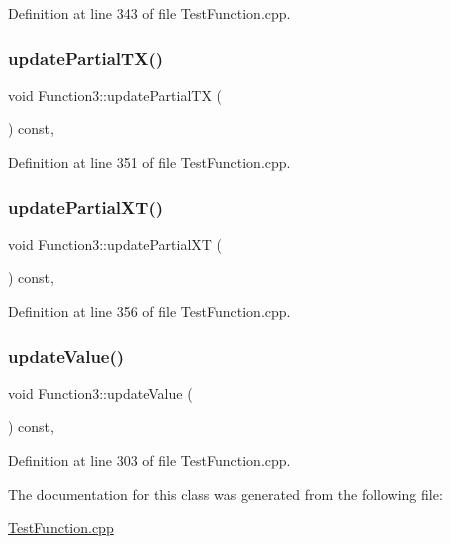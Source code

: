 Definition at line 343 of file Test\+Function.\+cpp.

\hypertarget{classFunction3_a9e969d761e7694eef0c5695cb198f0cd}{}\label{classFunction3_a9e969d761e7694eef0c5695cb198f0cd} 
\subsubsection{\texorpdfstring{update\+Partial\+T\+X()}{updatePartialTX()}}
{\footnotesize\ttfamily void Function3\+::update\+Partial\+TX (\begin{DoxyParamCaption}{ }\end{DoxyParamCaption}) const\hspace{0.3cm}{\ttfamily [inline]}, {\ttfamily [protected]}}



Definition at line 351 of file Test\+Function.\+cpp.

\hypertarget{classFunction3_ac363f9786af5a5bf700943b558ecbe92}{}\label{classFunction3_ac363f9786af5a5bf700943b558ecbe92} 
\subsubsection{\texorpdfstring{update\+Partial\+X\+T()}{updatePartialXT()}}
{\footnotesize\ttfamily void Function3\+::update\+Partial\+XT (\begin{DoxyParamCaption}{ }\end{DoxyParamCaption}) const\hspace{0.3cm}{\ttfamily [inline]}, {\ttfamily [protected]}}



Definition at line 356 of file Test\+Function.\+cpp.

\hypertarget{classFunction3_a61a81957c58f90042f8df6e10974d6ef}{}\label{classFunction3_a61a81957c58f90042f8df6e10974d6ef} 
\subsubsection{\texorpdfstring{update\+Value()}{updateValue()}}
{\footnotesize\ttfamily void Function3\+::update\+Value (\begin{DoxyParamCaption}{ }\end{DoxyParamCaption}) const\hspace{0.3cm}{\ttfamily [inline]}, {\ttfamily [protected]}}



Definition at line 303 of file Test\+Function.\+cpp.



The documentation for this class was generated from the following file\+:\begin{DoxyCompactItemize}
\item 
\hyperlink{TestFunction_8cpp}{Test\+Function.\+cpp}\end{DoxyCompactItemize}

